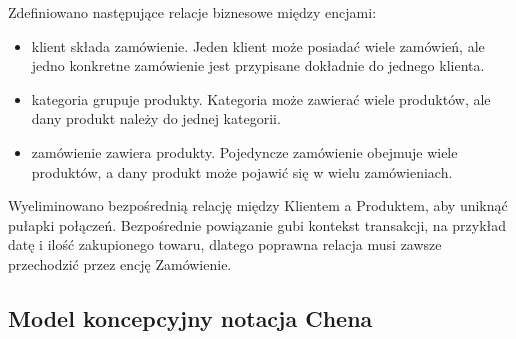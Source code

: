 \documentclass[letterpaper,10pt,polish]{sphinxmanual}
\begin{document}
\sphinxAtStartPar
Zdefiniowano następujące relacje biznesowe między encjami:
\begin{itemize}
\item {} 
\sphinxAtStartPar
{} klient składa zamówienie. Jeden klient może posiadać wiele zamówień, ale jedno konkretne zamówienie jest przypisane dokładnie do jednego klienta.

\item {} 
\sphinxAtStartPar
{} kategoria grupuje produkty. Kategoria może zawierać wiele produktów, ale dany produkt należy do jednej kategorii.

\item {} 
\sphinxAtStartPar
{} zamówienie zawiera produkty. Pojedyncze zamówienie obejmuje wiele produktów, a dany produkt może pojawić się w wielu zamówieniach.

\end{itemize}

\sphinxAtStartPar
{}

\sphinxAtStartPar
Wyeliminowano bezpośrednią relację między Klientem a Produktem, aby uniknąć pułapki połączeń. Bezpośrednie powiązanie gubi kontekst transakcji, na przykład datę i ilość zakupionego towaru, dlatego poprawna relacja musi zawsze przechodzić przez encję Zamówienie.


\subsection{Model koncepcyjny \textendash{} notacja Chena}
\label{\detokenize{rozdzial_3/index:model-koncepcyjny-notacja-chena}}\begin{quote}

\noindent{}
\end{quote}
\end{document}

